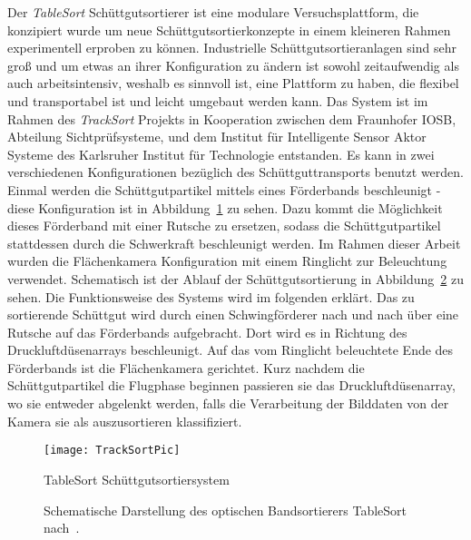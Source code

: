 Der \textit{TableSort} Schüttgutsortierer ist eine modulare Versuchsplattform, die konzipiert wurde um neue Schüttgutsortierkonzepte in einem kleineren Rahmen experimentell erproben zu können.
Industrielle Schüttgutsortieranlagen sind sehr groß und um etwas an ihrer Konfiguration zu ändern ist sowohl zeitaufwendig als auch arbeitsintensiv, 
weshalb es sinnvoll ist, eine Plattform zu haben, die flexibel und transportabel ist und leicht umgebaut werden kann.
Das System ist im Rahmen des \textit{TrackSort} Projekts in Kooperation zwischen dem Fraunhofer IOSB, Abteilung Sichtprüfsysteme, und dem Institut für Intelligente Sensor Aktor Systeme des Karlsruher Institut für Technologie entstanden\cite{doll2015}.
Es kann in zwei verschiedenen Konfigurationen bezüglich des Schüttguttransports benutzt werden.
Einmal werden die Schüttgutpartikel mittels eines Förderbands beschleunigt - diese Konfiguration ist in Abbildung~\ref{fig:tablesortsystem} zu sehen.
Dazu kommt die Möglichkeit dieses Förderband mit einer Rutsche zu ersetzen, sodass die Schüttgutpartikel stattdessen durch die Schwerkraft beschleunigt werden. 
Im Rahmen dieser Arbeit wurden die Flächenkamera Konfiguration mit einem Ringlicht zur Beleuchtung verwendet.
Schematisch ist der Ablauf der Schüttgutsortierung in Abbildung~\ref{fig:aufbau_tablesort} zu sehen.
Die Funktionsweise des Systems wird im folgenden erklärt.
Das zu sortierende Schüttgut wird durch einen Schwingförderer nach und nach über eine Rutsche auf das Förderbands aufgebracht.
Dort wird es in Richtung des Druckluftdüsenarrays beschleunigt. 
Auf das vom Ringlicht beleuchtete Ende des Förderbands ist die Flächenkamera gerichtet.
Kurz nachdem die Schüttgutpartikel die Flugphase beginnen passieren sie das Druckluftdüsenarray, wo sie entweder abgelenkt werden, 
falls die Verarbeitung der Bilddaten von der Kamera sie als auszusortieren klassifiziert.

\begin{figure}[h]
	\texttt{[image: TrackSortPic]}
	\caption{TableSort Schüttgutsortiersystem \cite{fraunhoferiosb2017}}
	\label{fig:tablesortsystem}
\end{figure}


\begin{figure}[h]
    \centering
    \def\svgwidth{\columnwidth}
	
	\caption[Schematische Darstellung des optischen Bandsortierers TableSort nach~\cite{Pfaff2017}.]{
		Schematische Darstellung des optischen Bandsortierers TableSort nach~\cite{Pfaff2017}.
	}
	\label{fig:aufbau_tablesort}

\end{figure}


